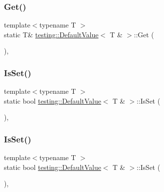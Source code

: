 \subsubsection{\texorpdfstring{Get()}{Get()}\hspace{0.1cm}{\footnotesize\ttfamily [3/3]}}
{\footnotesize\ttfamily template$<$typename T $>$ \\
static T\& \mbox{\hyperlink{classtesting_1_1_default_value}{testing\+::\+Default\+Value}}$<$ T \& $>$\+::Get (\begin{DoxyParamCaption}{ }\end{DoxyParamCaption})\hspace{0.3cm}{\ttfamily [inline]}, {\ttfamily [static]}}

\mbox{\label{classtesting_1_1_default_value_3_01_t_01_6_01_4_a3e61547c2f0141cc8004385f3a9c817d}} 
\subsubsection{\texorpdfstring{IsSet()}{IsSet()}\hspace{0.1cm}{\footnotesize\ttfamily [1/3]}}
{\footnotesize\ttfamily template$<$typename T $>$ \\
static bool \mbox{\hyperlink{classtesting_1_1_default_value}{testing\+::\+Default\+Value}}$<$ T \& $>$\+::Is\+Set (\begin{DoxyParamCaption}{ }\end{DoxyParamCaption})\hspace{0.3cm}{\ttfamily [inline]}, {\ttfamily [static]}}

\mbox{\label{classtesting_1_1_default_value_3_01_t_01_6_01_4_a3e61547c2f0141cc8004385f3a9c817d}} 
\subsubsection{\texorpdfstring{IsSet()}{IsSet()}\hspace{0.1cm}{\footnotesize\ttfamily [2/3]}}
{\footnotesize\ttfamily template$<$typename T $>$ \\
static bool \mbox{\hyperlink{classtesting_1_1_default_value}{testing\+::\+Default\+Value}}$<$ T \& $>$\+::Is\+Set (\begin{DoxyParamCaption}{ }\end{DoxyParamCaption})\hspace{0.3cm}{\ttfamily [inline]}, {\ttfamily [static]}}

